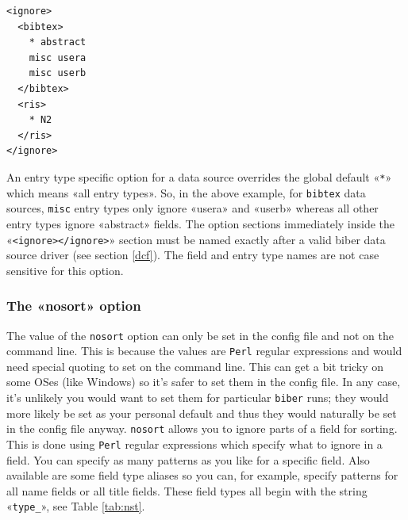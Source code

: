 \documentclass{ltxdockit}
\begin{document}
\begin{verbatim}
<ignore>
  <bibtex>
    * abstract
    misc usera
    misc userb
  </bibtex>
  <ris>
    * N2  
  </ris>
</ignore>
\end{verbatim}

\noindent An entry type specific option for a data source overrides the
global default «\verb+*+» which means «all entry types». So, in the above
example, for \verb+bibtex+ data sources, \verb+misc+ entry types only ignore
«usera» and «userb» whereas all other entry types ignore «abstract» fields.
The option sections immediately inside the «\verb+<ignore></ignore>+» section must be
named exactly after a valid biber data source driver (see section \ref{dcf}).
The field and entry type names are not case sensitive for this option.

\subsubsection{The «nosort» option}

The value of the \verb+nosort+ option can only be set in the config file
and not on the command line. This is because the values are \verb+Perl+ regular
expressions and would need special quoting to set on the command line. This
can get a bit tricky on some OSes (like Windows) so it's safer to set them
in the config file. In any case, it's unlikely you would want to set them
for particular \verb+biber+ runs; they would more likely be set as your
personal default and thus they would naturally be set in the config file
anyway. \verb+nosort+ allows you to ignore parts of a field for sorting.
This is done using \verb+Perl+ regular expressions which specify what to
ignore in a field. You can specify as many patterns as you like for a
specific field. Also available are some field type aliases so you can, for
example, specify patterns for all name fields or all title fields. These
field types all begin with the string «\verb+type_+», see Table
\ref{tab:nst}.
\end{document}
